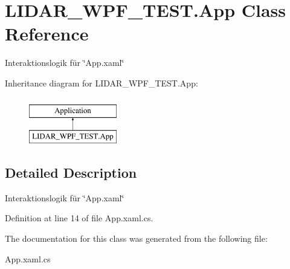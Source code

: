 \hypertarget{class_l_i_d_a_r___w_p_f___t_e_s_t_1_1_app}{}\section{L\+I\+D\+A\+R\+\_\+\+W\+P\+F\+\_\+\+T\+E\+S\+T.\+App Class Reference}
\label{class_l_i_d_a_r___w_p_f___t_e_s_t_1_1_app}


Interaktionslogik für \char`\"{}\+App.\+xaml\char`\"{}  


Inheritance diagram for L\+I\+D\+A\+R\+\_\+\+W\+P\+F\+\_\+\+T\+E\+S\+T.\+App\+:\begin{figure}[H]
\begin{center}
\leavevmode
\includegraphics[height=2.000000cm]{class_l_i_d_a_r___w_p_f___t_e_s_t_1_1_app}
\end{center}
\end{figure}


\subsection{Detailed Description}
Interaktionslogik für \char`\"{}\+App.\+xaml\char`\"{} 



Definition at line 14 of file App.\+xaml.\+cs.



The documentation for this class was generated from the following file\+:\begin{DoxyCompactItemize}
\item 
App.\+xaml.\+cs\end{DoxyCompactItemize}
